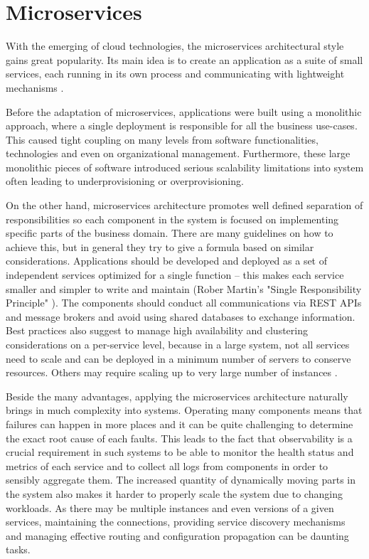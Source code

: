 \section{Microservices}

With the emerging of cloud technologies, the microservices architectural style gains great popularity. Its main idea is to create an application as a suite of small services, each running in its own process and communicating with lightweight mechanisms \cite{MicroservicesMF}.

Before the adaptation of microservices, applications were built using a monolithic approach, where a single deployment is responsible for all the business use-cases. This caused tight coupling on many levels from software functionalities, technologies and even on organizational management. Furthermore, these large monolithic pieces of software introduced serious scalability limitations into system often leading to underprovisioning or overprovisioning.

On the other hand, microservices architecture promotes well defined separation of responsibilities so each component in the system is focused on implementing specific parts of the business domain. There are many guidelines on how to achieve this, but in general they try to give a formula based on similar considerations. Applications should be developed and deployed as a set of independent services optimized for a single function -- this makes each service smaller and simpler to write and maintain (Rober Martin's "Single Responsibility Principle" \cite{RobertMartinOOP}). The components should conduct all communications via REST APIs and message brokers and avoid using shared databases to exchange information. Best practices also suggest to manage high availability and clustering considerations on a per-service level, because in a large system, not all services need to scale and can be deployed in a minimum number of servers to conserve resources. Others may require scaling up to very large number of instances \cite{ImplPatternsMicrosServices}.

Beside the many advantages, applying the microservices architecture naturally brings in much complexity into systems. Operating many components means that failures can happen in more places and it can be quite challenging to determine the exact root cause of each faults. This leads to the fact that observability is a crucial requirement in such systems to be able to monitor the health status and metrics of each service and to collect all logs from components in order to sensibly aggregate them. The increased quantity of dynamically moving parts in the system also makes it harder to properly scale the system due to changing workloads. As there may be multiple instances and even versions of a given services, maintaining the connections, providing service discovery mechanisms and managing effective routing and configuration propagation can be daunting tasks.

